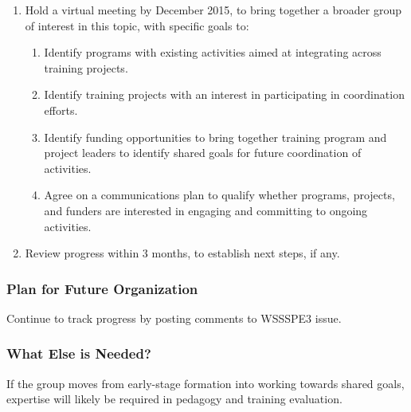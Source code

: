 \begin{enumerate}

\item Hold a virtual meeting by December 2015, to bring together a broader group
of interest in this topic, with specific goals to:

	\begin{enumerate}
	    
	\item Identify programs with existing activities aimed at integrating across
	training projects.
	        
	\item Identify training projects with an interest in participating in
	coordination efforts.
	        
	\item Identify funding opportunities to bring together training program and
	project leaders to identify shared goals for future coordination of activities.
	        
	\item Agree on a communications plan to qualify whether programs, projects, and
	funders are interested in engaging and committing to ongoing activities.
	        
	\end{enumerate}
    
\item Review progress within 3 months, to establish next steps, if any.

\end{enumerate}

\subsubsection{Plan for Future Organization}

Continue to track progress by posting comments to WSSSPE3 issue.

\subsubsection{What Else is Needed?}

If the group moves from early-stage formation into working towards shared goals,
expertise will likely be required in pedagogy and training evaluation.

